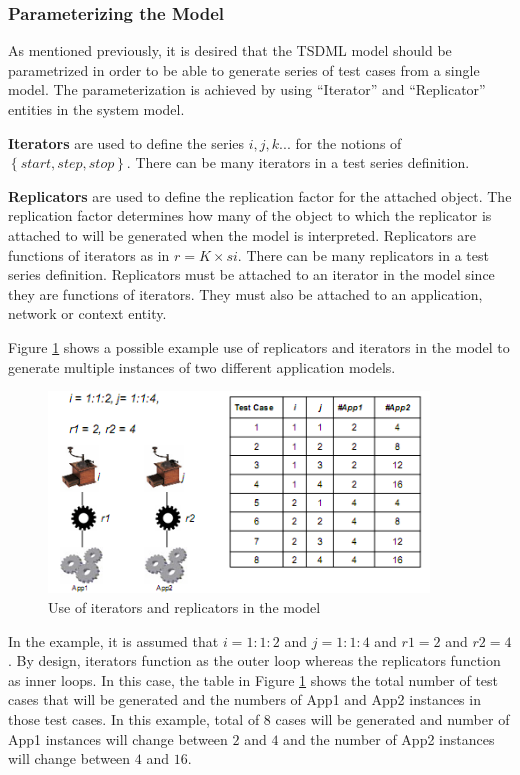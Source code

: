 \subsubsection{Parameterizing the Model}
\label{SubSubSection:Parameterizing}
As mentioned previously, it is desired that the TSDML model should be parametrized in order to be able to generate series of test cases from a single model. The parameterization is achieved by using ``Iterator'' and ``Replicator'' entities in the system model.

\textbf{Iterators} are used to define the series $i, j, k ...$ for the notions of $\left\{start, step, stop\right\}$. There can be many iterators in a test series definition.

\textbf{Replicators} are used to define the replication factor for the attached object. The replication factor determines how many of the object to which the replicator is attached to will be generated when the model is interpreted. Replicators are functions of iterators as in $r = K \times si$. There can be many replicators in a test series definition. Replicators must be attached to an iterator in the model since they are functions of iterators. They must also be attached to an application, network or context entity.

Figure \ref{fig:iterator-replicator} shows a possible example use of replicators and iterators in the model to generate multiple instances of two different application models. 

\begin{figure}
	\centering
		\includegraphics[width=0.90\textwidth]{figures/iterator-replicator.png}
	\caption{Use of iterators and replicators in the model}
	\label{fig:iterator-replicator}
\end{figure}

In the example, it is assumed that $i = 1:1:2$ and $j = 1:1:4$ and $r1 = 2$ and $r2=4$. By design, iterators function as the outer loop whereas the replicators function as inner loops. In this case, the table in Figure \ref{fig:iterator-replicator} shows the total number of test cases that will be generated and the numbers of App1 and App2 instances in those test cases. In this example, total of $8$ cases will be generated and number of App1 instances will change between $2$ and $4$ and the number of App2 instances will change between $4$ and $16$.

